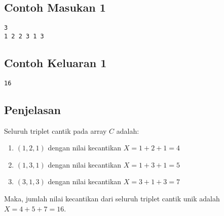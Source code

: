 \documentclass{article}
\begin{document}
\begin{multicols}{2}
\subsection*{Contoh Masukan 1}
\begin{lstlisting}
3
1 2 2 3 1 3
\end{lstlisting}
\columnbreak
\subsection*{Contoh Keluaran 1}
\begin{lstlisting}
16
\end{lstlisting}
\vfill
\null
\end{multicols}


\subsection*{Penjelasan}

Seluruh triplet cantik pada array $C$ adalah:
\begin{enumerate}
    \item $(1,2,1)$ dengan nilai kecantikan $X=1+2+1=4$
    \item $(1,3,1)$ dengan nilai kecantikan $X=1+3+1=5$
    \item $(3,1,3)$ dengan nilai kecantikan $X=3+1+3=7$
\end{enumerate}
Maka, jumlah nilai kecantikan dari seluruh triplet cantik unik adalah $X=4+5+7=16$.

%
%
\end{document}
